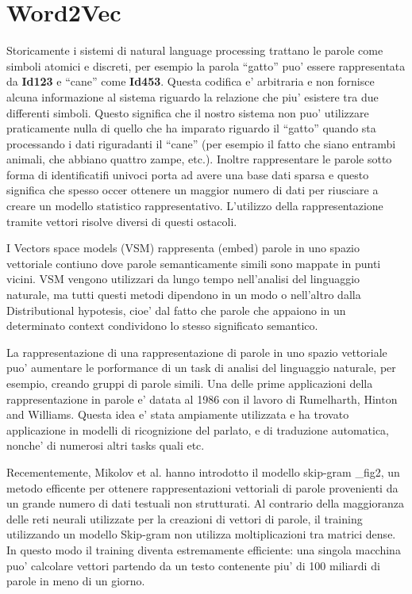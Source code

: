 \documentclass[a4paper,11pt]{book}
\theoremstyle{definition}
\begin{document}
\section{Word2Vec}
Storicamente i sistemi di natural language processing trattano le parole come simboli atomici e discreti,
per esempio la parola ``gatto'' puo' essere rappresentata da \textbf{Id123} e ``cane'' come \textbf{Id453}.
Questa codifica e' arbitraria e non fornisce alcuna informazione al sistema riguardo la relazione
che piu' esistere tra due differenti simboli.
Questo significa che il nostro sistema non puo' utilizzare praticamente nulla di quello che ha imparato
riguardo il ``gatto'' quando sta processando i dati riguradanti il ``cane'' (per esempio il fatto che siano
entrambi animali, che abbiano quattro zampe, etc.).
Inoltre rappresentare le parole sotto forma di identificatifi univoci porta ad avere una base dati sparsa
e questo significa che spesso occer ottenere un maggior numero di dati per riusciare a creare un modello
statistico rappresentativo.
L'utilizzo della rappresentazione tramite vettori risolve diversi di questi ostacoli.

I Vectors space models (VSM) rappresenta (embed) parole in uno spazio vettoriale contiuno dove parole
semanticamente simili sono mappate in punti vicini.
VSM vengono utilizzari da lungo tempo nell'analisi del linguaggio naturale, ma tutti questi metodi dipendono
in un modo o nell'altro dalla Distributional hypotesis, cioe' dal fatto che parole che appaiono in 
un determinato context condividono lo stesso significato semantico.

La rappresentazione di una rappresentazione di parole in uno spazio vettoriale puo' aumentare le porformance
di un task di analisi del linguaggio naturale, per esempio, creando gruppi di parole simili. Una delle prime
applicazioni della rappresentazione in parole e' datata al 1986 con il lavoro di Rumelharth, Hinton and Williams.
Questa idea e' stata ampiamente utilizzata e ha trovato applicazione in modelli di ricognizione del parlato,
e di traduzione automatica, nonche' di numerosi altri tasks quali etc.

Recementemente, Mikolov et al. hanno introdotto il modello skip-gram \_fig2, un metodo efficente per ottenere
rappresentazioni vettoriali di parole provenienti da un grande numero di dati testuali non strutturati.
Al contrario della maggioranza delle reti neurali utilizzate per la creazioni di vettori di parole, 
il training utilizzando un modello Skip-gram non utilizza moltiplicazioni tra matrici dense.
In questo modo il training diventa estremamente efficiente: una singola macchina puo' calcolare vettori
partendo da un testo contenente piu' di 100 miliardi di parole in meno di un giorno.
\end{document}
